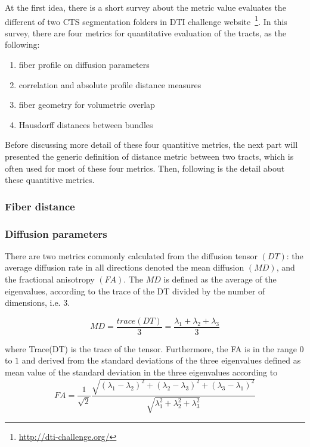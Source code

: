 At the first idea, there is a short survey about the metric value evaluates the different of two CTS segmentation folders in DTI challenge website~\footnote{\url{http://dti-challenge.org/}}. In this survey, there are four metrics for quantitative evaluation of the tracts, as the following:
\begin{enumerate}
	\item fiber profile on diffusion parameters
	\item correlation and absolute profile distance measures
	\item fiber geometry
	for volumetric overlap
	\item Hausdorff distances between bundles
\end{enumerate}

Before discussing more detail of these four quantitive metrics, the next part will presented the generic definition of distance metric between two tracts, which is often used for most of these four metrics. Then,  following is the detail about these quantitive metrics. 

\subsubsection{Fiber distance}
\label{subsec:experiments_quatification_fiber_distance}
\cite{tsai2007fiber, jiao2010metrics}



\subsubsection{Diffusion parameters}
\label{subsec:experiments_quatification_diffusion}
There are two metrics commonly calculated from the diffusion tensor $(DT)$: the average diffusion rate in all
directions denoted the mean diffusion $(MD)$, and the fractional anisotropy $(FA)$. The $MD$ is
defined as the average of the eigenvalues, according to the trace of the DT divided by the
number of dimensions, i.e. 3.

\begin{equation}
   MD=\frac{trace(DT)}{3}=\frac{\lambda_{1}+\lambda_{2}+\lambda_{3}}{3}
   \label{Equ:MD}	
\end{equation}

where Trace(DT) is the trace of the tensor. Furthermore, the FA is in the range $0$ to $1$ and derived
from the standard deviations of the three eigenvalues defined as mean value of the standard
deviation in the three eigenvalues according to
\begin{equation}
   FA=\frac{1}{\sqrt{2}}\frac{\sqrt{(\lambda_{1}-\lambda_{2})^{2}+(\lambda_{2}-\lambda_{3})^{2}+(\lambda_{3}-\lambda_{1})^{2}}}{\sqrt{\lambda_{1}^{2}+\lambda_{2}^{2}+\lambda_{3}^{2}}}
   \label{Equ:FA}	
\end{equation}

